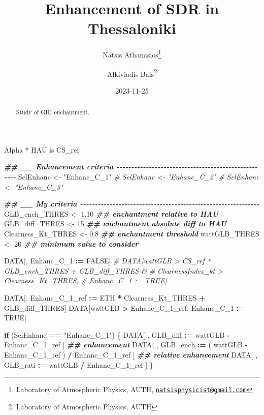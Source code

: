 \documentclass[
  10pt,
  a4paper,oneside]{article}
\title{Enhancement of SDR in Thessaloniki}
\author{Natsis Athanasios\footnote{Laboratory of Atmospheric Physics, AUTH, \href{mailto:natsisphysicist@gmail.com}{\nolinkurl{natsisphysicist@gmail.com}}} \and Alkiviadis Bais\footnote{Laboratory of Atmospheric Physics, AUTH}}
\date{2023-11-25}
\newenvironment{Shaded}{\begin{snugshade}}{\end{snugshade}}
\newcommand{\CommentTok}[1]{\textcolor[rgb]{0.56,0.35,0.01}{\textit{#1}}}
\newcommand{\ConstantTok}[1]{\textcolor[rgb]{0.56,0.35,0.01}{#1}}
\newcommand{\ControlFlowTok}[1]{\textcolor[rgb]{0.13,0.29,0.53}{\textbf{#1}}}
\newcommand{\DecValTok}[1]{\textcolor[rgb]{0.00,0.00,0.81}{#1}}
\newcommand{\DocumentationTok}[1]{\textcolor[rgb]{0.56,0.35,0.01}{\textbf{\textit{#1}}}}
\newcommand{\FloatTok}[1]{\textcolor[rgb]{0.00,0.00,0.81}{#1}}
\newcommand{\NormalTok}[1]{#1}
\newcommand{\OtherTok}[1]{\textcolor[rgb]{0.56,0.35,0.01}{#1}}
\newcommand{\SpecialCharTok}[1]{\textcolor[rgb]{0.81,0.36,0.00}{\textbf{#1}}}
\newcommand{\StringTok}[1]{\textcolor[rgb]{0.31,0.60,0.02}{#1}}
\begin{document}
\maketitle
\begin{abstract}
Study of GHI enchantment.
\end{abstract}

{
\hypersetup{linkcolor=}
\setcounter{tocdepth}{4}
\tableofcontents
}
Alpha * HAU is CS\_ref

\begin{Shaded}
\begin{Highlighting}[]
\DocumentationTok{\#\# \_\_ Enhancement criteria  {-}{-}{-}{-}{-}{-}{-}{-}{-}{-}{-}{-}{-}{-}{-}{-}{-}{-}{-}{-}{-}{-}{-}{-}{-}{-}{-}{-}{-}{-}{-}{-}{-}{-}{-}{-}{-}{-}{-}{-}{-}{-}{-}{-}{-}{-}{-}{-}{-}{-}{-}{-}}
\NormalTok{SelEnhanc }\OtherTok{\textless{}{-}} \StringTok{"Enhanc\_C\_1"}
\CommentTok{\# SelEnhanc \textless{}{-} "Enhanc\_C\_2"}
\CommentTok{\# SelEnhanc \textless{}{-} "Enhanc\_C\_3"}

\DocumentationTok{\#\# \_\_ My criteria  {-}{-}{-}{-}{-}{-}{-}{-}{-}{-}{-}{-}{-}{-}{-}{-}{-}{-}{-}{-}{-}{-}{-}{-}{-}{-}{-}{-}{-}{-}{-}{-}{-}{-}{-}{-}{-}{-}{-}{-}{-}{-}{-}{-}{-}{-}{-}{-}{-}{-}{-}{-}{-}{-}{-}{-}{-}{-}{-}{-}{-}}
\NormalTok{GLB\_ench\_THRES     }\OtherTok{\textless{}{-}}  \FloatTok{1.10} \DocumentationTok{\#\# enchantment relative to HAU}
\NormalTok{GLB\_diff\_THRES     }\OtherTok{\textless{}{-}} \DecValTok{15}    \DocumentationTok{\#\# enchantment absolute diff to HAU}
\NormalTok{Clearness\_Kt\_THRES }\OtherTok{\textless{}{-}}  \FloatTok{0.8}  \DocumentationTok{\#\# enchantment threshold}
\NormalTok{wattGLB\_THRES      }\OtherTok{\textless{}{-}} \DecValTok{20}    \DocumentationTok{\#\# minimum value to consider}

\NormalTok{DATA[, Enhanc\_C\_1 }\SpecialCharTok{:=} \ConstantTok{FALSE}\NormalTok{]}
\CommentTok{\# DATA[wattGLB           \textgreater{} CS\_ref * GLB\_ench\_THRES + GLB\_diff\_THRES \&}
\CommentTok{\#      ClearnessIndex\_kt \textgreater{} Clearness\_Kt\_THRES,}
\CommentTok{\#      Enhanc\_C\_1 := TRUE]}

\NormalTok{DATA[, Enhanc\_C\_1\_ref }\SpecialCharTok{:=}\NormalTok{ ETH }\SpecialCharTok{*}\NormalTok{ Clearness\_Kt\_THRES }\SpecialCharTok{+}\NormalTok{ GLB\_diff\_THRES]}
\NormalTok{DATA[wattGLB }\SpecialCharTok{\textgreater{}}\NormalTok{ Enhanc\_C\_1\_ref,}
\NormalTok{     Enhanc\_C\_1 }\SpecialCharTok{:=} \ConstantTok{TRUE}\NormalTok{]}

\ControlFlowTok{if}\NormalTok{ (SelEnhanc }\SpecialCharTok{==} \StringTok{"Enhanc\_C\_1"}\NormalTok{) \{}
\NormalTok{    DATA[ , GLB\_diff }\SpecialCharTok{:=}\NormalTok{   wattGLB }\SpecialCharTok{{-}}\NormalTok{ Enhanc\_C\_1\_ref                    ] }\DocumentationTok{\#\# enhancement}
\NormalTok{    DATA[ , GLB\_ench }\SpecialCharTok{:=}\NormalTok{ ( wattGLB }\SpecialCharTok{{-}}\NormalTok{ Enhanc\_C\_1\_ref ) }\SpecialCharTok{/}\NormalTok{ Enhanc\_C\_1\_ref ] }\DocumentationTok{\#\# relative enhancement}
\NormalTok{    DATA[ , GLB\_rati }\SpecialCharTok{:=}\NormalTok{   wattGLB }\SpecialCharTok{/}\NormalTok{ Enhanc\_C\_1\_ref                    ]}
\NormalTok{\}}



\end{Highlighting}
\end{Shaded}
\end{document}

